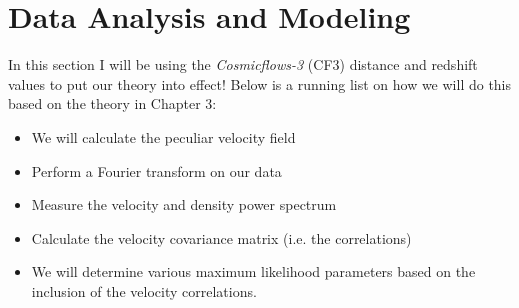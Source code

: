 \chapter{Data Analysis and Modeling}

In this section I will be using the \textit{Cosmicflows-3} (CF3) distance and redshift values to put our theory into effect! Below is a running list on how we will do this based on the theory in Chapter 3:

\begin{itemize}

\item We will calculate the peculiar velocity field

\item Perform a Fourier transform on our data

\item Measure the velocity and density power spectrum

\item Calculate the velocity covariance matrix (i.e. the correlations)

\item We will determine various maximum likelihood parameters based on the inclusion of the velocity correlations.
\end{itemize}